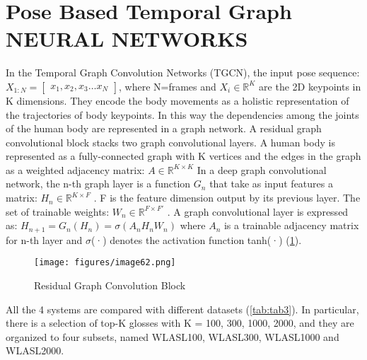 \documentclass[12pt]{book}
\begin{document}
\section{Pose Based Temporal Graph NEURAL NETWORKS}
In the Temporal Graph Convolution Networks (TGCN), the input pose sequence: $X_{1:N}=
\begin{bmatrix}
	x_1, x_2, x_3 \dots x_N
\end{bmatrix}$, where N=frames and  \newcommand{\R}{\mathbb{R}} $X_i \in \R^K$ are the 2D keypoints in K dimensions. They encode the body movements as a holistic representation of the trajectories of body keypoints. In this way the dependencies among the joints of the human body are represented in a graph network. A residual graph convolutional block stacks two graph convolutional layers. A human body is represented as a fully-connected graph with K vertices and the edges in the graph as a weighted adjacency matrix: $A \in \R^{K \times K}$ In a deep graph convolutional network, the n-th graph layer is a function $G_n$ that take as input features a matrix: $H_n \in \R^{K \times F}$ . F is the feature dimension output by its previous layer. The set of trainable weights: $W_n \in \R^{F \times F'}$ . A graph convolutional layer is expressed as: $H_{n+1}=G_n(H_n)=\sigma(A_n H_n W_n)$ where $A_n$ is a trainable adjacency matrix for n-th layer and $\sigma$(·) denotes the activation function tanh(·) (\ref{fig:fig32}).

\begin{figure}[!htbp]
\centering
  \texttt{[image: figures/image62.png]}
  \\
  \caption{Residual Graph Convolution Block \cite{DON2020}}
  \label{fig:fig32}
\end{figure}

All the 4 systems are compared with different datasets (\ref{tab:tab3}). In particular, there is a selection of top-K glosses with K = {100, 300, 1000, 2000}, and they are organized to four subsets, named WLASL100, WLASL300, WLASL1000 and WLASL2000.
\end{document}
